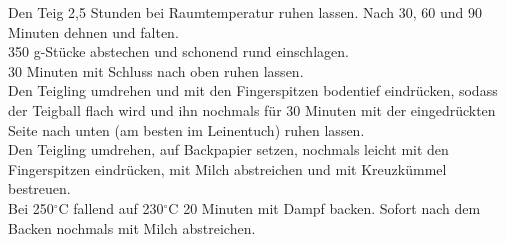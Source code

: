 Den Teig 2,5 Stunden bei Raumtemperatur ruhen lassen. Nach 30, 60 und 90 Minuten dehnen und falten.\\
350 g-Stücke abstechen und schonend rund einschlagen.\\
30 Minuten mit Schluss nach oben ruhen lassen.\\
Den Teigling umdrehen und mit den Fingerspitzen bodentief eindrücken, sodass der Teigball flach wird und ihn nochmals für 30 Minuten mit der eingedrückten Seite nach unten (am besten im Leinentuch) ruhen lassen.\\
Den Teigling umdrehen, auf Backpapier setzen, nochmals leicht mit den Fingerspitzen eindrücken, mit Milch abstreichen und mit Kreuzkümmel bestreuen.\\
Bei 250$^\circ$C fallend auf 230$^\circ$C 20 Minuten mit Dampf backen.
Sofort nach dem Backen nochmals mit Milch abstreichen.
\newpage


